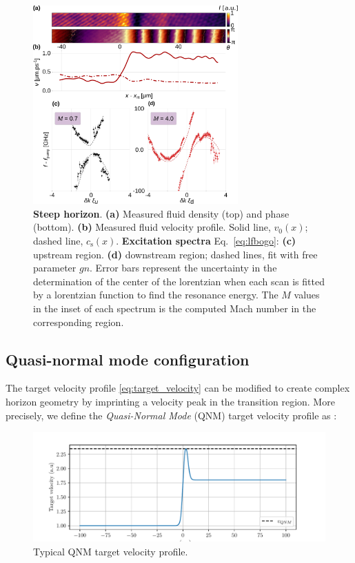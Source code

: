 \begin{figure}
    \centering
    \includegraphics[width=0.7\textwidth]{chap_custom_st/fig/bh_steep.pdf}
    \caption{\textbf{Steep horizon}.    
    \textbf{(a)} Measured fluid density (top) and phase (bottom).
    \textbf{(b)} Measured fluid velocity profile.
    Solid line, $v_0(x)$; dashed line, $c_\mathrm{s}(x)$.
    \textbf{Excitation spectra} Eq.~\eqref{eq:lfbogo}: \textbf{(c)} upstream region. \textbf{(d)} downstream region; dashed lines, fit with free parameter $gn$. Error bars represent the uncertainty in the determination
    of the center of the lorentzian when each scan is fitted by a lorentzian function to find the resonance energy. The $M$ values in the inset of each spectrum is the computed Mach number in the corresponding region. }
    \label{fig:bh_steep}
\end{figure}

\subsection{Quasi-normal mode configuration}

The target velocity profile \autoref{eq:target_velocity} can be modified to create complex horizon geometry by imprinting 
a velocity peak in the transition region. More precisely, we define the \textit{Quasi-Normal Mode} (QNM) target velocity profile as :

\begin{figure}
    \centering
    \includegraphics[width=1\textwidth]{chap_custom_st/fig/qnm_target_velocity.pdf}
    \caption{Typical QNM target velocity profile.}
    \label{fig:qnm_target_velocity}
\end{figure}


